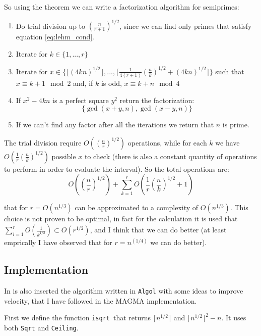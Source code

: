 \documentclass{article}
\theoremstyle{plain}
\theoremstyle{remark}
\theoremstyle{definition}
\begin{document}
So using the theorem we can write a factorization algorithm for semiprimes:
\begin{enumerate}
	\item \label{enum:trial_div} Do trial division up to $\left( \frac{n}{r+1}\right)^{1/2}$, since we can find only primes that satisfy equation \ref{eq:lehm_cond}.
	\item Iterate for $k \in \{ 1,...,r\}$ 
	\item \label{enum:lehm_xit} Iterate for $x \in \{ \lfloor (4kn)^{1/2}\rfloor , ..., \lceil \frac{1}{4(r+1)} \left(\frac{n}{k}\right)^{1/2} + (4kn)^{1/2} \rceil \}$ such that $x \equiv k + 1 \mod 2$ and, if $k$ is odd, $x \equiv k + n \mod 4$
	\item If $x^2 - 4kn$ is a perfect square $y^2$ return the factorization: 
		$$\{\gcd(x+y,n), \gcd(x-y,n)\}$$
	\item If we can't find any factor after all the iterations we return that $n$ is prime.
\end{enumerate}

The trial division require $O\left( \left( \frac{n}{r}\right)^{1/2} \right)$ operations, while for each $k$ we have $O\left( \frac{1}{r} \left(\frac{n}{k}\right)^{1/2} \right)$ possible $x$ to check (there is also a constant quantity of operations to perform in order to evaluate the interval). So the total operations are:
\begin{equation}
	\label{eq:lehm_compl}
	O\left( \left( \frac{n}{r}\right)^{1/2} \right) + \sum_{k =1}^r O\left( \frac{1}{r} \left(\frac{n}{k}\right)^{1/2} + 1\right)
\end{equation}

that for $r = O(n^{1/3})$ can be approximated to a complexity of $O(n^{1/3})$. This choice is not proven to be optimal, in fact for the calculation it is used that $ \sum_{i=1}^r O\left( \frac{1}{k^{1/2}}\right) \subset O(r^{1/2})$, and I think that we can do better (at least emprically I have observed that for $r = n^(1/4)$ we can do better).

\subsection{Implementation}

In \cite[Section 5]{lehman} is also inserted the algorithm written in \texttt{Algol} with some ideas to improve velocity, that I have followed in the MAGMA implementation. 

First we define the function \texttt{isqrt} that returns $\lceil n^{1/2}\rceil$ and $\lceil n^{1/2}\rceil^2 - n$. It uses both \texttt{Sqrt} and \texttt{Ceiling}. 
\end{document}
